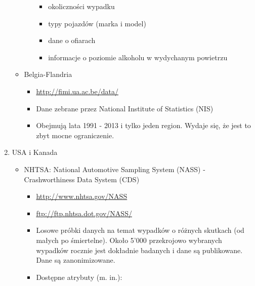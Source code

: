 \begin{enumerate}
\begin{itemize}
\begin{itemize}
      \begin{itemize}
      \itemsep1pt\parskip0pt
      \item
        okoliczności wypadku\\
      \item
        typy pojazdów (marka i model)\\
      \item
        dane o ofiarach\\
      \item
        informacje o poziomie alkoholu w wydychanym powietrzu\\
      \end{itemize}
    \end{itemize}
  \item
    Belgia-Flandria

    \begin{itemize}
    \itemsep1pt\parskip0pt
    \item
      \url{http://fimi.ua.ac.be/data/}\\
    \item
      Dane zebrane przez National Institute of Statistics (NIS)\\
    \item
      Obejmują lata 1991 - 2013 i tylko jeden region. Wydaje się, że
      jest to zbyt mocne ograniczenie.
    \end{itemize}
  \end{itemize}
\item
  USA i Kanada

  \begin{itemize}
  \item
    NHTSA: National Automotive Sampling System (NASS) - Crashworthiness
    Data System (CDS)

    \begin{itemize}
    \item
      \url{http://www.nhtsa.gov/NASS}\\
    \item
      \url{ftp://ftp.nhtsa.dot.gov/NASS/}\\
    \item
      Losowe próbki danych na temat wypadków o różnych skutkach (od
      małych po śmiertelne). Około 5'000 przekrojowo wybranych wypadków
      rocznie jest dokładnie badanych i dane są publikowane. Dane są
      zanonimizowane.\\
    \item
      Dostępne atrybuty (m. in.):


\end{itemize}
\end{itemize}
\end{enumerate}
